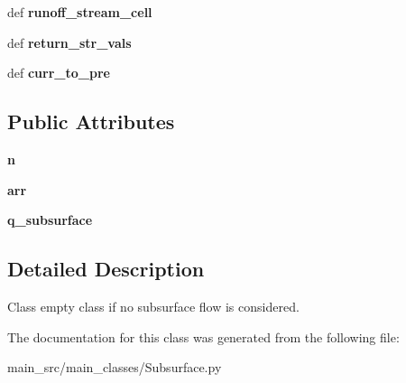 \begin{DoxyCompactItemize}
\item 
\hypertarget{classmain__src_1_1main__classes_1_1Subsurface_1_1SubsurfacePass_a7a900def519552be7e1e765e234c2ef6}{def {\bfseries runoff\-\_\-stream\-\_\-cell}}\label{classmain__src_1_1main__classes_1_1Subsurface_1_1SubsurfacePass_a7a900def519552be7e1e765e234c2ef6}

\item 
\hypertarget{classmain__src_1_1main__classes_1_1Subsurface_1_1SubsurfacePass_a493bf92ea4ee6de8b4f7dbec1855dd91}{def {\bfseries return\-\_\-str\-\_\-vals}}\label{classmain__src_1_1main__classes_1_1Subsurface_1_1SubsurfacePass_a493bf92ea4ee6de8b4f7dbec1855dd91}

\item 
\hypertarget{classmain__src_1_1main__classes_1_1Subsurface_1_1SubsurfacePass_afad3521ca33f1f64933e9fd6e8714244}{def {\bfseries curr\-\_\-to\-\_\-pre}}\label{classmain__src_1_1main__classes_1_1Subsurface_1_1SubsurfacePass_afad3521ca33f1f64933e9fd6e8714244}

\end{DoxyCompactItemize}
\subsection*{Public Attributes}
\begin{DoxyCompactItemize}
\item 
\hypertarget{classmain__src_1_1main__classes_1_1Subsurface_1_1SubsurfacePass_a6430e7d1e9ea0cf69c796a505899a1a7}{{\bfseries n}}\label{classmain__src_1_1main__classes_1_1Subsurface_1_1SubsurfacePass_a6430e7d1e9ea0cf69c796a505899a1a7}

\item 
\hypertarget{classmain__src_1_1main__classes_1_1Subsurface_1_1SubsurfacePass_aa4e34364be24b61465c72346a6be0a0d}{{\bfseries arr}}\label{classmain__src_1_1main__classes_1_1Subsurface_1_1SubsurfacePass_aa4e34364be24b61465c72346a6be0a0d}

\item 
\hypertarget{classmain__src_1_1main__classes_1_1Subsurface_1_1SubsurfacePass_a29b3d4788eddfcd884dbf665d5edeccf}{{\bfseries q\-\_\-subsurface}}\label{classmain__src_1_1main__classes_1_1Subsurface_1_1SubsurfacePass_a29b3d4788eddfcd884dbf665d5edeccf}

\end{DoxyCompactItemize}


\subsection{Detailed Description}
Class empty class if no subsurface flow is considered. 

The documentation for this class was generated from the following file\-:\begin{DoxyCompactItemize}
\item 
main\-\_\-src/main\-\_\-classes/Subsurface.\-py\end{DoxyCompactItemize}
